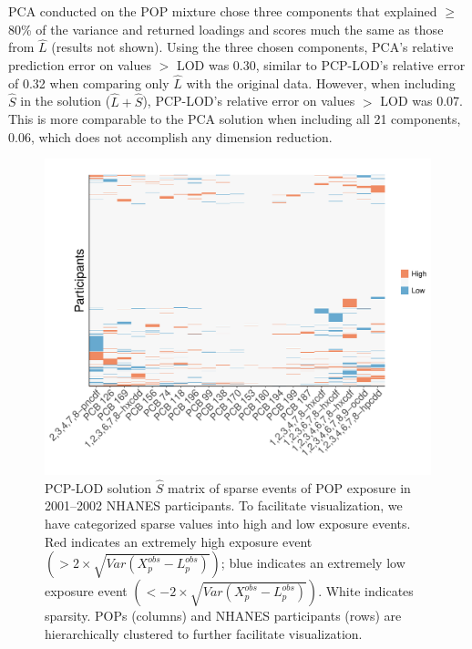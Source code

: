 PCA conducted on the POP mixture chose three components that explained $\ge$ 80\% of the variance and returned loadings and scores much the same as those from $\hat{L}$ (results not shown). Using the three chosen components, PCA's relative prediction error on values $>$ LOD was 0.30, similar to PCP-LOD's relative error of 0.32 when comparing only $\hat{L}$ with the original data. However, when including $\hat{S}$ in the solution ($\hat{L} + \hat{S}$), PCP-LOD's relative error on values $>$ LOD was 0.07. This is more comparable to the PCA solution when including all 21 components, 0.06, which does not accomplish any dimension reduction.

\begin{landscape}
\begin{figure}
    \centering
\includegraphics[scale=0.58]{figures/sparse_events.pdf}
   \caption[Sparse POP events in NHANES 2001--2002  participants]{PCP-LOD solution $\hat{S}$ matrix of sparse events of POP exposure in 2001--2002 NHANES participants. To facilitate visualization, we have categorized sparse values into high and low exposure events. Red indicates an extremely high exposure event $\left(> 2 \times \sqrt{Var(X_{p}^{obs} - L_{p}^{obs})}\right)$; blue indicates an extremely low exposure event $\left(< -2 \times \sqrt{Var(X_{p}^{obs} - L_{p}^{obs})}\right)$. White indicates sparsity. POPs (columns) and NHANES participants (rows) are hierarchically clustered to further facilitate visualization.}
    \label{fig:sparse}
\end{figure}
\end{landscape}

